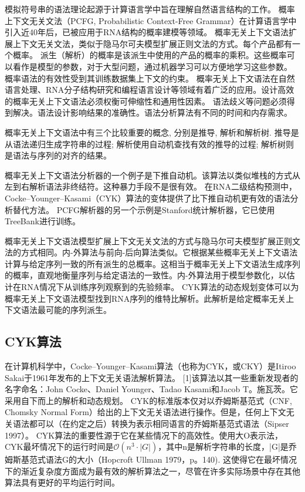 模拟符号串的语法理论起源于计算语言学中旨在理解自然语言结构的工作\cite{chomsky1956three, chomsky1959certain, lees1957syntactic}。
概率上下文无关文法（PCFG, Probabilistic Context-Free Grammar）在计算语言学中引入近40年后，已被应用于RNA结构的概率建模等领域\cite{sakakibara1994stochastic}。
概率无关上下文语法扩展上下文无关文法，类似于隐马尔可夫模型扩展正则文法的方式。每个产品都有一个概率。
派生（解析）的概率是该派生中使用的产品的概率的乘积。这些概率可以看作是模型的参数，对于大型问题，通过机器学习可以方便地学习这些参数。
概率语法的有效性受到其训练数据集上下文的约束。
概率无关上下文语法在自然语言处理、RNA分子结构研究和编程语言设计等领域有着广泛的应用。设计高效的概率无关上下文语法必须权衡可伸缩性和通用性因素。
语法歧义等问题必须得到解决。语法设计影响结果的准确性。语法分析算法有不同的时间和内存需求。

概率无关上下文语法中有三个比较重要的概念, 分别是推导, 解析和解析树. 
推导是从语法递归生成字符串的过程; 解析使用自动机查找有效的推导的过程; 解析树则是语法与序列的对齐的结果。

概率无关上下文语法分析器的一个例子是下推自动机\cite{sippl1999biological}。该算法以类似堆栈的方式从左到右解析语法非终结符。这种暴力手段不是很有效。
在RNA二级结构预测中，Cocke–Younger–Kasami（CYK）算法的变体提供了比下推自动机更有效的语法分析替代方法。
PCFG解析器的另一个示例是Stanford统计解析器\cite{klein2003accurate}，它已使用TreeBank进行训练。

概率无关上下文语法模型扩展上下文无关文法的方式与隐马尔可夫模型扩展正则文法的方式相同。内-外算法与前向-后向算法类似。它根据某些概率无关上下文语法计算与给定序列一致的所有派生的总概率。这相当于概率无关上下文语法生成序列的概率，直观地衡量序列与给定语法的一致性。内-外算法用于模型参数化，以估计在RNA情况下从训练序列观察到的先验频率。
CYK算法的动态规划变体可以为概率无关上下文语法模型找到RNA序列的维特比解析。此解析是给定概率无关上下文语法最可能的序列派生。

\subsection{CYK算法}

在计算机科学中，Cocke–Younger–Kasami算法（也称为CYK，或CKY）是Itiroo Sakai\cite{mey1965international}于1961年发布的上下文无关语法解析算法。
[1]该算法以其一些重新发现者的名字命名：John Cocke、Daniel Younger、Tadao Kasami和Jacob T。施瓦茨。它采用自下而上的解析和动态规划。
CYK的标准版本仅对以乔姆斯基范式（CNF, Chomsky Normal Form）给出的上下文无关语法进行操作。但是，任何上下文无关语法都可以（在约定之后）转换为表示相同语言的乔姆斯基范式语法（Sipser 1997）。
CYK算法的重要性源于它在某些情况下的高效性。使用大O表示法，CYK最坏情况下的运行时间是$\displaystyle \mathcal{O} (n^{3} \cdot |G|)$，其中n是解析字符串的长度，|G|是乔姆斯基范式语法G的大小（Hopcroft Ullman 1979，p。140). 
这使得它在最坏情况下的渐近复杂度方面成为最有效的解析算法之一，尽管在许多实际场景中存在其他算法具有更好的平均运行时间\cite{sipser1997context}。

